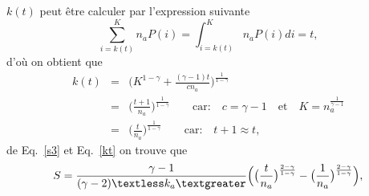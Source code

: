   $k(t)$ peut être calculer par l'expression suivante
  \begin{equation}
  \sum_{i=k(t)}^Kn_aP(i)=\int_{i=k(t)}^Kn_aP(i)di=t,
  \end{equation}
 d'où on obtient que
   \begin{eqnarray}
   k(t)&=&\Big(K^{1-\gamma}+\frac{(\gamma-1)t}{cn_a}\Big)^{\frac{1}{1-\gamma}}\nonumber\\
     &=& \Big(\frac{t+1}{n_a}\Big)^{\frac{1}{1-\gamma}} \quad \quad  \text{car:} \quad c=\gamma-1 \quad \text{et} \quad K=n_a^{\frac{1}{\gamma-1}} \nonumber\\
     &=& \Big(\frac{t}{n_a}\Big)^{\frac{1}{1-\gamma}}
     \quad \quad  \text{car:} \quad t+1\approx t,
     \label{kt}
   \end{eqnarray}
 de Eq.~\ref{s3} et Eq.~\ref{kt} on trouve que
 \begin{equation}
 S=\frac{\gamma-1}{(\gamma-2)\kma}\Big(\big(\frac{t}{n_a}\big)^{\frac{2-\gamma}{1-\gamma}}-\big(\frac{1}{n_a}\big)^{\frac{2-\gamma}{1-\gamma}}\Big),
 \label{s4}
 \end{equation}
 
